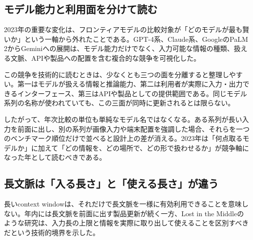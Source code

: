 
\subsection{モデル能力と利用面を分けて読む}

2023年の重要な変化は、フロンティアモデルの比較対象が「どのモデルが最も賢いか」という一軸から外れたことである。GPT-4系、Claude系、GoogleのPaLM 2からGeminiへの展開は、モデル能力だけでなく、入力可能な情報の種類、扱える文脈、APIや製品への配置を含む複合的な競争を可視化した。\autocite{src-013fa77665db,src-3375c5d27d9b,src-39071a9443e5,src-5bfa9c93d034,src-93d355bf8806,src-a3dead6cff65,src-a95452783369,src-b1525886b462,src-db671ee1d1b8,src-f5041642fb21,src-f951bda6a0f4,src-fd9cb9c0061f}


この競争を技術的に読むときは、少なくとも三つの面を分離すると整理しやすい。第一はモデルが扱える情報と推論能力、第二は利用者が実際に入力・出力できるインターフェース、第三はAPIや製品としての提供範囲である。同じモデル系列の名称が使われていても、この三面が同時に更新されるとは限らない。\autocite{src-013fa77665db,src-3375c5d27d9b,src-39071a9443e5,src-5bfa9c93d034,src-93d355bf8806,src-a3dead6cff65,src-a95452783369,src-b1525886b462,src-db671ee1d1b8,src-f5041642fb21,src-f951bda6a0f4,src-fd9cb9c0061f}


したがって、年次比較の単位も単純なモデル名ではなくなる。ある系列が長い入力を前面に出し、別の系列が画像入力や端末配置を強調した場合、それらを一つのベンチマーク順位だけで並べると設計上の差が消える。2023年は「何点取るモデルか」に加えて「どの情報を、どの場所で、どの形で扱わせるか」が競争軸になった年として読むべきである。\autocite{src-3375c5d27d9b,src-5bfa9c93d034,src-93d355bf8806,src-a3dead6cff65,src-a95452783369,src-db671ee1d1b8,src-e116708067ab,src-f951bda6a0f4,src-fd9cb9c0061f}


\subsection{長文脈は「入る長さ」と「使える長さ」が違う}

長いcontext windowは、それだけで長文脈を一様に有効利用できることを意味しない。年内には長文脈を前面に出す製品更新が続く一方、Lost in the Middleのような研究は、入力長の上限と情報を実際に取り出して使えることを区別すべきだという技術的境界を示した。\autocite{src-013fa77665db,src-2b6af707f3ef,src-39071a9443e5,src-93d355bf8806,src-a3dead6cff65,src-b1525886b462,src-db671ee1d1b8,src-f5041642fb21,src-fd9cb9c0061f}


